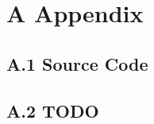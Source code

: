 \documentclass[11pt]{report}
\begin{document}
\chapter*{\vspace{-3cm}A Appendix}

\section*{A.1 Source Code}

\section*{A.2 TODO}
\end{document}
